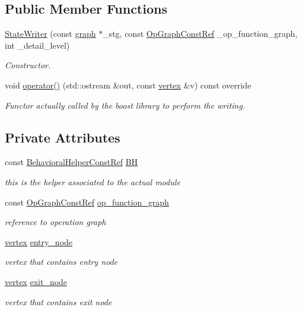 \subsection*{Public Member Functions}
\begin{DoxyCompactItemize}
\item 
\hyperlink{classStateWriter_a7295924318382f7d3cce1691a4b01165}{State\+Writer} (const \hyperlink{structgraph}{graph} $\ast$\+\_\+stg, const \hyperlink{op__graph_8hpp_a9a0b240622c47584bee6951a6f5de746}{Op\+Graph\+Const\+Ref} \+\_\+op\+\_\+function\+\_\+graph, int \+\_\+detail\+\_\+level)
\begin{DoxyCompactList}\small\item\em Constructor. \end{DoxyCompactList}\item 
void \hyperlink{classStateWriter_a2c861e031d9bba75843879f2c9dd098f}{operator()} (std\+::ostream \&out, const \hyperlink{graph_8hpp_abefdcf0544e601805af44eca032cca14}{vertex} \&v) const override
\begin{DoxyCompactList}\small\item\em Functor actually called by the boost library to perform the writing. \end{DoxyCompactList}\end{DoxyCompactItemize}
\subsection*{Private Attributes}
\begin{DoxyCompactItemize}
\item 
const \hyperlink{behavioral__helper_8hpp_aae973b54cac87eef3b27442aa3e1e425}{Behavioral\+Helper\+Const\+Ref} \hyperlink{classStateWriter_a561b71f47ff140e6200425ce70af97da}{BH}
\begin{DoxyCompactList}\small\item\em this is the helper associated to the actual module \end{DoxyCompactList}\item 
const \hyperlink{op__graph_8hpp_a9a0b240622c47584bee6951a6f5de746}{Op\+Graph\+Const\+Ref} \hyperlink{classStateWriter_abcb4ae917ec6ffa9b15fd81615a82071}{op\+\_\+function\+\_\+graph}
\begin{DoxyCompactList}\small\item\em reference to operation graph \end{DoxyCompactList}\item 
\hyperlink{graph_8hpp_abefdcf0544e601805af44eca032cca14}{vertex} \hyperlink{classStateWriter_af4cb9892d0113b94691263547e690f4b}{entry\+\_\+node}
\begin{DoxyCompactList}\small\item\em vertex that contains entry node \end{DoxyCompactList}\item 
\hyperlink{graph_8hpp_abefdcf0544e601805af44eca032cca14}{vertex} \hyperlink{classStateWriter_a7444586062a025924265918fe48a165a}{exit\+\_\+node}
\begin{DoxyCompactList}\small\item\em vertex that contains exit node \end{DoxyCompactList}\end{DoxyCompactItemize}
